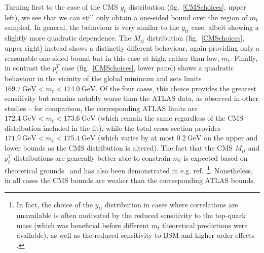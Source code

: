 \documentclass[sn-mathphys]{sn-jnl}%
\newcommand{\pT}{p^T_t}
\newcommand{\mtt}{M_{t\bar{t}}}
\newcommand{\yt}{y_{t}}
\newcommand{\ytt}{y_{t\bar{t}}}
\newcommand{\mt}{m_t}
\newcommand{\gev}{\mathrm{GeV}}
\begin{document}
Turning first to the case of the CMS $\yt$ distribution (fig.~\ref{CMSchoices}, upper left), we see that we can still only obtain a one-sided bound over the region of $\mt$ sampled. In general, the behaviour is very similar to the $\ytt$ case, albeit showing a slightly more quadratic dependence. The $\mtt$ distribution (fig.~\ref{CMSchoices}, upper right) instead shows a distinctly different behaviour, again providing only a reasonable one-sided bound but in this case at high, rather than low, $\mt$. Finally, in contrast the $\pT$ case (fig.~\ref{CMSchoices}, lower panel) shows a quadratic behaviour in the vicinity of the global minimum and sets limits $169.7~\gev\lt\mt\lt174.0~\gev$. Of the four cases, this choice provides the greatest sensitivity but remains notably worse than the ATLAS data, as observed in other studies -- for comparison, the corresponding ATLAS limits are $172.4~\gev<\mt<173.6~\gev$ (which remain the same regardless of the CMS distribution included in the fit), while the total cross section provides $171.9~\gev<\mt<175.4~\gev$ (which varies by at most $0.2~\gev$ on the upper and lower bounds as the CMS distribution is altered). The fact that the CMS $\mtt$ and $\pT$ distributions are generally better able to constrain $\mt$ is expected based on theoretical grounds~\cite{Czakon:2016vfr,Czakon:2016olj,Ju:2019mqc} and has also been demonstrated in e.g. ref.~\cite{Cooper-Sarkar:2020twv}\footnote{In fact, the choice of the $\ytt$ distribution in cases where correlations are unavailable is often motivated by the reduced sensitivity to the top-quark mass (which was beneficial before different $\mt$ theoretical predictions were available), as well as the reduced sensitivity to BSM and higher order effects \cite{NNPDF:2017mvq,NNPDF:2021njg,Kadir:2020yml}.}. Nonetheless, in all cases the CMS bounds are weaker than the corresponding ATLAS bounds.
\end{document}
